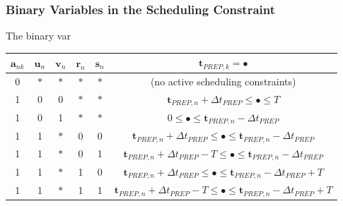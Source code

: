 \documentclass{beamer}
\begin{document}
\begin{frame}
    \frametitle{Binary Variables in the Scheduling Constraint}
    The binary var
    \begin{table}
        \centering
        \small
        \begin{tabular}{c c c c c | c}
            $\boldsymbol{a}_{nk}$ & $\boldsymbol{u}_{n}$ & $\boldsymbol{v}_{n}$
            & $\boldsymbol{r}_{n}$ & $\boldsymbol{s}_{n}$
            & $\boldsymbol{t}_{\mathit{PREP},k} = \bullet$\\\hline
            0 & $\ast$ & $\ast$ & $\ast$ & $\ast$ 
            & (no active scheduling constraints)\\
            1 & 0 & 0 & $\ast$ & $\ast$
            & $\boldsymbol{t}_{\mathit{PREP},n} + \Delta t_{\mathit{PREP}} \le
                \bullet \le T$\\
            1 & 0 & 1 & $\ast$ & $\ast$ 
            & $0 \le \bullet \le \boldsymbol{t}_{\mathit{PREP},n} 
                - \Delta t_{\mathit{PREP}}$\\
            1 & 1 & $\ast$ & 0 & 0 
            & $\boldsymbol{t}_{\mathit{PREP},n} + \Delta t_{\mathit{PREP}}
                \le \bullet \le \boldsymbol{t}_{\mathit{PREP},n} 
                - \Delta t_{\mathit{PREP}}$\\
            1 & 1 & $\ast$ & 0 & 1 
            & $\boldsymbol{t}_{\mathit{PREP},n} + \Delta t_{\mathit{PREP}} - T
                \le \bullet \le \boldsymbol{t}_{\mathit{PREP},n}
                - \Delta t_{\mathit{PREP}}$\\
            1 & 1 & $\ast$ & 1 & 0 
            & $\boldsymbol{t}_{\mathit{PREP},n} + \Delta t_{\mathit{PREP}}
                \le \bullet \le \boldsymbol{t}_{\mathit{PREP},n}
                - \Delta t_{\mathit{PREP}} + T$\\
            1 & 1 & $\ast$ & 1 & 1 
            & $\boldsymbol{t}_{\mathit{PREP},n} + \Delta t_{\mathit{PREP}} - T
                \le \bullet \le \boldsymbol{t}_{\mathit{PREP},n}
                - \Delta t_{\mathit{PREP}} + T$\\
        \end{tabular}
    \end{table}
\end{frame}
\end{document}

